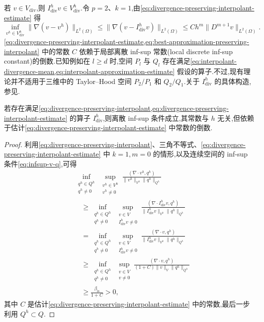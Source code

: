 \begin{note}
若 $v\in V_{\mathrm{div}}$,则 $I_{\mathrm{div}}^h v\in V_{\mathrm{div}}^h$.令 $p=2$、$k=1$,由\cref{eq:divergence-preserving-interpolant-estimate} 得
\begin{equation}\label{eq:best-approximation-preserving-interpolant}
  \inf_{v^h\in V_{\mathrm{div}}^h}
      \|\nabla(v-v^h)\|_{L^2(\Omega)}
    \le\|\nabla(v-I_{\mathrm{div}}^h v)\|_{L^2(\Omega)}
    \le Ch^m\|D^{m+1}v\|_{L^2(\Omega)}.
\end{equation}
\cref{eq:divergence-preserving-interpolant-estimate,eq:best-approximation-preserving-interpolant} 中的常数 $C$ 依赖于局部离散 inf-sup 常数(local discrete inf-sup constant)的倒数.已知例如在 $l\ge d$ 时,空间 $P_l$ 与 $Q_l$ 存在满足\cref{eq:interpolant-divergence-mean,eq:interpolant-approximation-estimate} 假设的算子.不过,现有理论并不适用于三维中的 Taylor--Hood 空间 $P_2/P_1$ 和 $Q_2/Q_1$.关于 $I_{\mathrm{div}}^h$ 的具体构造,参见\textcite{GiraultScott2003}.
\end{note}

\begin{lemma}\label{lem:div-preserving-interpolant-implies-infsup}
若存在满足\cref{eq:divergence-preserving-interpolant,eq:divergence-preserving-interpolant-estimate} 的算子 $I_{\mathrm{div}}^h$,则离散 inf-sup 条件成立,其常数与 $h$ 无关,但依赖于估计\cref{eq:divergence-preserving-interpolant-estimate} 中常数的倒数.
\end{lemma}
\begin{proof}
利用\cref{eq:divergence-preserving-interpolant}、三角不等式、\cref{eq:divergence-preserving-interpolant-estimate} 中 $k=1,m=0$ 的情形,以及连续空间的 inf-sup 条件\cref{eq:infsup-v-q},可得
\[
\begin{aligned}
  &\inf_{\substack{q^h\in Q^h\\q^h\ne0}}
   \sup_{\substack{v^h\in V^h\\v^h\ne0}}
    \frac{(\nabla\cdot v^h,q^h)}{\|v^h\|_{V^h}\|q^h\|_{Q^h}}\\
  &\quad\ge
   \inf_{\substack{q^h\in Q^h\\q^h\ne0}}
   \sup_{\substack{v\in V\\I_{\mathrm{div}}^h v\ne0}}
    \frac{(\nabla\cdot I_{\mathrm{div}}^h v,q^h)}
         {\|I_{\mathrm{div}}^h v\|_{V^h}\|q^h\|_{Q^h}}\\
  &\quad=\inf_{\substack{q^h\in Q^h\\q^h\ne0}}
   \sup_{\substack{v\in V\\I_{\mathrm{div}}^h v\ne0}}
    \frac{(\nabla\cdot v,q^h)}
         {\|I_{\mathrm{div}}^h v\|_{V^h}\|q^h\|_{Q^h}}\\
  &\quad\ge\inf_{\substack{q^h\in Q^h\\q^h\ne0}}
   \sup_{\substack{v\in V\\v\ne0}}
    \frac{(\nabla\cdot v,q^h)}
         {(1+C)\|v\|_V\|q^h\|_{Q^h}}\\
  &\quad\ge\frac{\beta_{\mathrm{is}}}{1+C}>0,
\end{aligned}
\]
其中 $C$ 是估计\cref{eq:divergence-preserving-interpolant-estimate} 中的常数,最后一步利用 $Q^h\subset Q$.
\end{proof}

